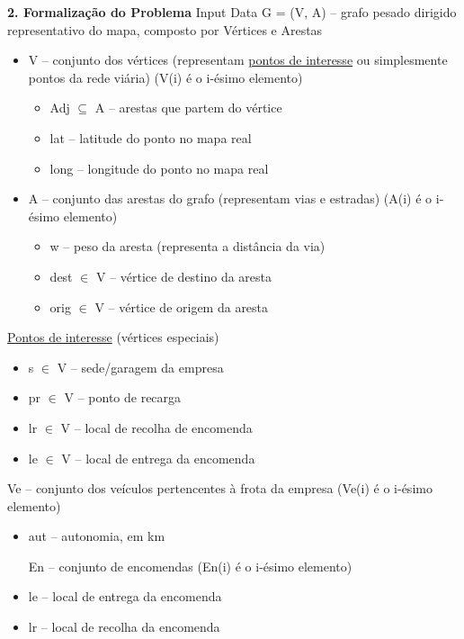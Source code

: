 \documentclass[12pt]{article}
\renewcommand{\_}{\kern-1.5pt\textunderscore\kern-1.5pt}
\begin{document}
\vspace{\baselineskip}
{\fontsize{20pt}{24.0pt}\selectfont \textbf{2. Formalização do Problema}}
{\fontsize{16pt}{19.2pt} Input Data}
G = (V, A) – grafo pesado dirigido representativo do mapa, composto por Vértices e Arestas
\begin{itemize}
	\item V – conjunto dos vértices (representam \uline{pontos de interesse} ou simplesmente pontos da rede viária) (V(i) é o i-ésimo elemento)
\begin{itemize}
	\item Adj $ \subseteq $  A – arestas que partem do vértice
	\item lat – latitude do ponto no mapa real
	\item long – longitude do ponto no mapa real

\end{itemize}
	\item A – conjunto das arestas do grafo (representam vias e estradas) (A(i) é o i-ésimo elemento)
\begin{itemize}
	\item w – peso da aresta (representa a distância da via)
	\item dest $ \in $  V – vértice de destino da aresta
	\item orig $ \in $  V – vértice de origem da aresta
\end{itemize}
\end{itemize}
\uline{Pontos de interesse} (vértices especiais)
\begin{itemize}
	\item s $ \in $  V – sede/garagem da empresa
	\item pr $ \in $  V – ponto de recarga
	\item lr $ \in $  V – local de recolha de encomenda
	\item le $ \in $  V – local de entrega da encomenda
\end{itemize}

\vspace{\baselineskip}
Ve – conjunto dos veículos pertencentes à frota da empresa (Ve(i) é o i-ésimo elemento)
\begin{itemize}
	\item aut – autonomia, em km

\vspace{\baselineskip}
En – conjunto de encomendas (En(i) é o i-ésimo elemento)
	\item le – local de entrega da encomenda
	\item lr – local de recolha da encomenda
\end{itemize}
\end{document}
